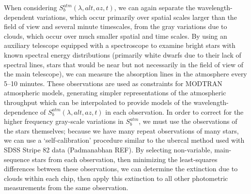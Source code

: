 \documentclass[12pt,preprint]{aastex}
\begin{document}
When considering $S_b^{atm}(\lambda,alt,az,t)$, we can again
separate the wavelength-dependent variations, which occur primarily over
spatial scales larger than the field of view and several minute timescales, from the gray
variations due to clouds, which occur over much smaller spatial and
time scales. By using an auxiliary telescope equipped with a
spectroscope to examine bright stars with known spectral energy
distributions (primarily white dwarfs due to their lack of spectral
lines, stars that would be near but not necessarily in the field of
view of the main telescope), we can measure the absorption lines in
the atmosphere every 5--10 minutes. These observations are used as
constraints for MODTRAN atmospheric models, generating simpler
representations of the atmospheric throughput which can be
interpolated to provide models of the wavelength-dependence of
$S_b^{atm}(\lambda,alt,az,t)$ in each observation. In order to correct
for the higher frequency gray-scale variations in $S_b^{atm}$, we must
use the observations of the stars themselves; because we have many repeat
observations of many stars, we can use a `self-calibration' procedure
similar to the ubercal method used with SDSS Stripe 82 data
(Padmanabhan REF). By selecting non-variable, main-sequence stars
from each observation, then minimizing the least-squares differences
between these observations, we can determine the extinction due to
clouds within each chip, then apply this extinction to all other
photometric measurements from the same observation. 
\end{document}
